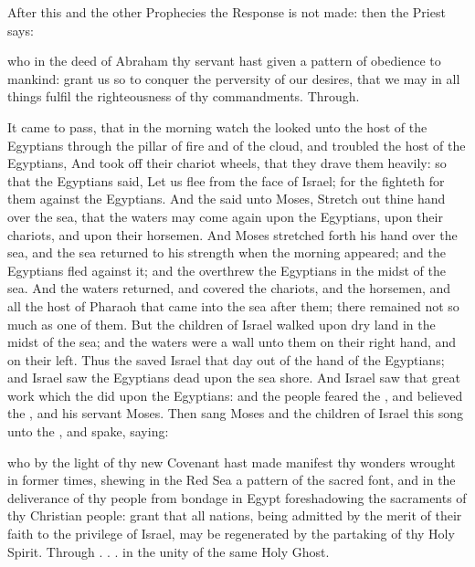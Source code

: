 \begin{rubric}
	After this and the other Prophecies the Response  is not made: then the Priest says:
\end{rubric}
{} who in the deed of Abraham thy servant hast given a pattern of obedience to mankind: grant us so to conquer the perversity of our desires, that we may in all things fulfil the righteousness of thy commandments. Through.

 It came to pass, that in the morning watch the  looked unto the host of the Egyptians through the pillar of fire and of the cloud, and troubled the host of the Egyptians, And took off their chariot wheels, that they drave them heavily: so that the Egyptians said, Let us flee from the face of Israel; for the  fighteth for them against the Egyptians. And the  said unto Moses, Stretch out thine hand over the sea, that the waters may come again upon the Egyptians, upon their chariots, and upon their horsemen. And Moses stretched forth his hand over the sea, and the sea returned to his strength when the morning appeared; and the Egyptians fled against it; and the  overthrew the Egyptians in the midst of the sea. And the waters returned, and covered the chariots, and the horsemen, and all the host of Pharaoh that came into the sea after them; there remained not so much as one of them. But the children of Israel walked upon dry land in the midst of the sea; and the waters were a wall unto them on their right hand, and on their left. Thus the  saved Israel that day out of the hand of the Egyptians; and Israel saw the Egyptians dead upon the sea shore. And Israel saw that great work which the  did upon the Egyptians: and the people feared the , and believed the , and his servant Moses. Then sang Moses and the children of Israel this song unto the , and spake, saying:


{} who by the light of thy new Covenant hast made manifest thy wonders wrought in former times, shewing in the Red Sea a pattern of the sacred font, and in the deliverance of thy people from bondage in Egypt foreshadowing the sacraments of thy Christian people: grant that all nations, being admitted by the merit of their faith to the privilege of Israel, may be regenerated by the partaking of thy Holy Spirit. Through . . . in the unity of the same Holy Ghost.

